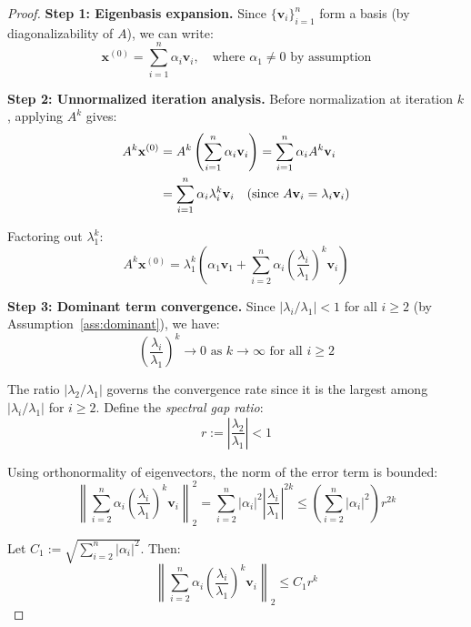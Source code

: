 \documentclass[11pt,a4paper]{article}
\begin{document}
\begin{proof}
\textbf{Step 1: Eigenbasis expansion.}
Since $\{\mathbf{v}_i\}_{i=1}^n$ form a basis (by diagonalizability of $A$), we can write:
\begin{equation}\label{eq:expansion}
\mathbf{x}^{(0)} = \sum_{i=1}^n \alpha_i \mathbf{v}_i, \quad \text{where } \alpha_1 \neq 0 \text{ by assumption}
\end{equation}

\textbf{Step 2: Unnormalized iteration analysis.}
Before normalization at iteration $k$, applying $A^k$ gives:
\begin{align}
A^k \mathbf{x}^{(0)} &= A^k \left(\sum_{i=1}^n \alpha_i \mathbf{v}_i\right) = \sum_{i=1}^n \alpha_i A^k \mathbf{v}_i \notag\\
&= \sum_{i=1}^n \alpha_i \lambda_i^k \mathbf{v}_i \quad \text{(since $A\mathbf{v}_i = \lambda_i\mathbf{v}_i$)} \label{eq:unnorm1}
\end{align}

Factoring out $\lambda_1^k$:
\begin{equation}\label{eq:factored}
A^k \mathbf{x}^{(0)} = \lambda_1^k \left(\alpha_1 \mathbf{v}_1 + \sum_{i=2}^n \alpha_i \left(\frac{\lambda_i}{\lambda_1}\right)^k \mathbf{v}_i\right)
\end{equation}

\textbf{Step 3: Dominant term convergence.}
Since $|\lambda_i/\lambda_1| < 1$ for all $i \geq 2$ (by Assumption~\ref{ass:dominant}), we have:
\begin{equation}
\left(\frac{\lambda_i}{\lambda_1}\right)^k \to 0 \text{ as } k \to \infty \text{ for all } i \geq 2
\end{equation}

The ratio $|\lambda_2/\lambda_1|$ governs the convergence rate since it is the largest among $|\lambda_i/\lambda_1|$ for $i \geq 2$. Define the \emph{spectral gap ratio}:
\begin{equation}
r := \left|\frac{\lambda_2}{\lambda_1}\right| < 1
\end{equation}

Using orthonormality of eigenvectors, the norm of the error term is bounded:
\begin{equation}
\left\|\sum_{i=2}^n \alpha_i \left(\frac{\lambda_i}{\lambda_1}\right)^k \mathbf{v}_i\right\|_2^2 = \sum_{i=2}^n |\alpha_i|^2 \left|\frac{\lambda_i}{\lambda_1}\right|^{2k} \leq \left(\sum_{i=2}^n |\alpha_i|^2\right) r^{2k}
\end{equation}

Let $C_1 := \sqrt{\sum_{i=2}^n |\alpha_i|^2}$. Then:
\begin{equation}\label{eq:error_bound}
\left\|\sum_{i=2}^n \alpha_i \left(\frac{\lambda_i}{\lambda_1}\right)^k \mathbf{v}_i\right\|_2 \leq C_1 r^k
\end{equation}


\end{proof}
\end{document}
